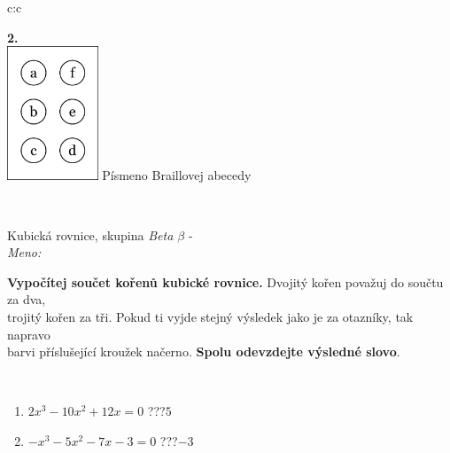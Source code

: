 \documentclass[10pt]{report}
\begin{document}
\begin{tabular}{c:c}
\begin{minipage}[c][104.5mm][t]{0.5\linewidth}
\begin{center}
\begin{minipage}{0.79\linewidth}
\begin{center}
\begin{varwidth}{\linewidth}
\begin{enumerate}
\end{enumerate}
\end{varwidth}
\end{center}
\end{minipage}
\begin{minipage}{0.20\linewidth}
\begin{center}
{\Huge\bfseries 2.} \\[2mm]
\includegraphics[height=40mm]{../images/braille.png}
{\small Písmeno Braillovej abecedy}
\end{center}
\end{minipage}
\end{center}
\end{minipage}
\\ \hdashline
\begin{minipage}[c][104.5mm][t]{0.5\linewidth}
\begin{center}
\vspace{7mm}
{\huge Kubická rovnice, skupina \textit{Beta $\beta$} -}\\[5mm]
\textit{Meno:}\phantom{xxxxxxxxxxxxxxxxxxxxxxxxxxxxxxxxxxxxxxxxxxxxxxxxxxxxxxxxxxxxxxxxx}\\[5mm]
\begin{minipage}{0.95\linewidth}
\textbf{Vypočítej součet kořenů kubické rovnice.} Dvojitý kořen považuj do součtu za dva,\\trojitý kořen za tři. Pokud ti vyjde stejný výsledek jako je za otazníky, tak napravo\\barvi příslušející kroužek načerno. \textbf{Spolu odevzdejte výsledné slovo}.
\end{minipage}
\\[1mm]
\begin{minipage}{0.79\linewidth}
\begin{center}
\begin{varwidth}{\linewidth}
\begin{enumerate}
\Large
\item $2x^3-10x^2+12x=0$\quad \dotfill\; ???\;\dotfill \quad $5$
\item $-x^3-5x^2-7x-3=0$\quad \dotfill\; ???\;\dotfill \quad $-3$

\end{enumerate}
\end{varwidth}
\end{center}
\end{minipage}
\end{center}
\end{minipage}
\end{tabular}
\end{document}

